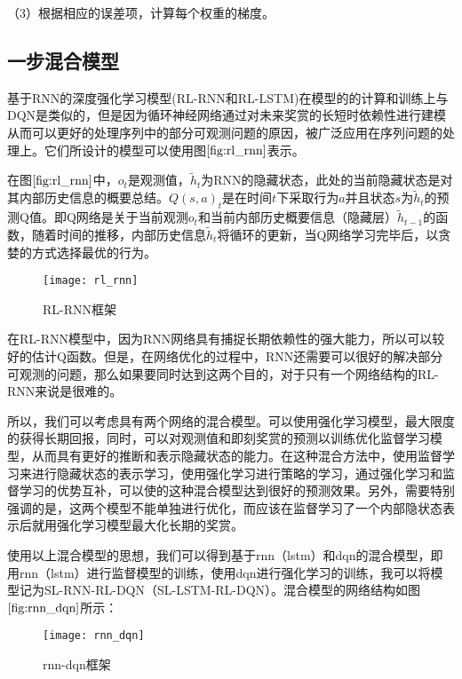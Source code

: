 （3）根据相应的误差项，计算每个权重的梯度。


\subsection{一步混合模型}
基于RNN的深度强化学习模型(RL-RNN和RL-LSTM)在模型的的计算和训练上与DQN是类似的，但是因为循环神经网络通过对未来奖赏的长短时依赖性进行建模从而可以更好的处理序列中的部分可观测问题的原因，被广泛应用在序列问题的处理上\citep{bakker2002reinforcement,hausknecht2015deep,lin1993reinforcement,narasimhan2015language}。它们所设计的模型可以使用图$\ref{fig:rl_rnn}$表示。

在图$\ref{fig:rl_rnn}$中，$o_{t}$是观测值，$\tilde{h}_{t}$为RNN的隐藏状态，此处的当前隐藏状态是对其内部历史信息的概要总结。$Q(s,a)_{t}$是在时间$t$下采取行为$a$并且状态$s$为$\tilde{h}_{t}$的预测Q值。即Q网络是关于当前观测$o_{t}$和当前内部历史概要信息（隐藏层）$\tilde{h}_{t-1}$的函数，随着时间的推移，内部历史信息$\tilde{h}_{t}$将循环的更新，当Q网络学习完毕后，以贪婪的方式选择最优的行为。
\begin{figure}[htbp]
\centering
\texttt{[image: rl\_rnn]}
\caption{RL-RNN框架}
\label{fig:rl_rnn}
\end{figure}

在RL-RNN模型中，因为RNN网络具有捕捉长期依赖性的强大能力，所以可以较好的估计Q函数。但是，在网络优化的过程中，RNN还需要可以很好的解决部分可观测的问题，那么如果要同时达到这两个目的，对于只有一个网络结构的RL-RNN来说是很难的。

所以，我们可以考虑具有两个网络的混合模型。可以使用强化学习模型，最大限度的获得长期回报，同时，可以对观测值和即刻奖赏的预测以训练优化监督学习模型，从而具有更好的推断和表示隐藏状态的能力。在这种混合方法中，使用监督学习来进行隐藏状态的表示学习，使用强化学习进行策略的学习，通过强化学习和监督学习的优势互补，可以使的这种混合模型达到很好的预测效果。另外，需要特别强调的是，这两个模型不能单独进行优化，而应该在监督学习了一个内部隐状态表示后就用强化学习模型最大化长期的奖赏。

使用以上混合模型的思想，我们可以得到基于rnn（lstm）和dqn的混合模型，即用rnn（lstm）进行监督模型的训练，使用dqn进行强化学习的训练，我可以将模型记为SL-RNN-RL-DQN（SL-LSTM-RL-DQN）。混合模型的网络结构如图$\ref{fig:rnn_dqn}$所示：
\begin{figure}[htbp]
\centering
\texttt{[image: rnn\_dqn]}
\caption{rnn-dqn框架}
\label{fig:rnn_dqn}
\end{figure}

